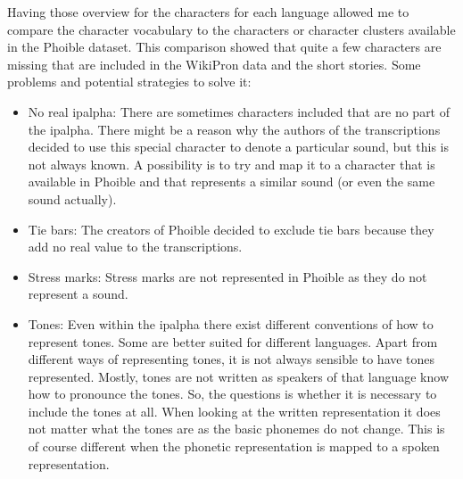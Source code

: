 Having those overview for the characters for each language allowed me to compare the character vocabulary to the characters or character clusters available in the Phoible dataset. This comparison showed that quite a few characters are missing that are included in the WikiPron data and the short stories. Some problems and potential strategies to solve it:

\begin{itemize}
\item No real \ac{ipalpha}: There are sometimes characters included that are no part of the \ac{ipalpha}. There might be a reason why the authors of the transcriptions decided to use this special character to denote a particular sound, but this is not always known. A possibility is to try and map it to a character that is available in Phoible and that represents a similar sound (or even the same sound actually). 
\item Tie bars: The creators of Phoible decided to exclude tie bars because they add no real value to the transcriptions. 
\item Stress marks: Stress marks are not represented in Phoible as they do not represent a sound. 
\item Tones: Even within the \ac{ipalpha} there exist different conventions of how to represent tones. Some are better suited for different languages. Apart from different ways of representing tones, it is not always sensible to have tones represented. Mostly, tones are not written as speakers of that language know how to pronounce the tones. So, the questions is whether it is necessary to include the tones at all. When looking at the written representation it does not matter what the tones are as the basic phonemes do not change. This is of course different when the phonetic representation is mapped to a spoken representation. 
\end{itemize}



